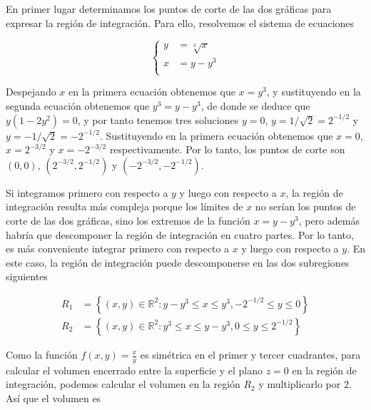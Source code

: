 \documentclass[
  a4paper,
]{scrreport}
\theoremstyle{definition}
\theoremstyle{remark}
\begin{document}
\begin{tcolorbox}[enhanced jigsaw, opacityback=0, bottomtitle=1mm, coltitle=black, opacitybacktitle=0.6, colback=white, breakable, left=2mm, titlerule=0mm, bottomrule=.15mm, colbacktitle=quarto-callout-tip-color!10!white, toprule=.15mm, leftrule=.75mm, arc=.35mm, toptitle=1mm, colframe=quarto-callout-tip-color-frame, title=\textcolor{quarto-callout-tip-color}{\faLightbulb}\hspace{0.5em}{Solución}, rightrule=.15mm]

En primer lugar determinamos los puntos de corte de las dos gráficas
para expresar la región de integración. Para ello, resolvemos el sistema
de ecuaciones

\[
\begin{cases}
y &= \sqrt[3]{x}\\
x &= y-y^3 \\
\end{cases}
\]

Despejando \(x\) en la primera ecuación obtenemos que \(x=y^3\), y
sustituyendo en la segunda ecuación obtenemos que \(y^3 = y-y^3\), de
donde se deduce que \(y(1-2y^2)=0\), y por tanto tenemos tres soluciones
\(y=0\), \(y=1/\sqrt{2}=2^{-1/2}\) y \(y=-1/\sqrt{2}=-2^{-1/2}\).
Sustituyendo en la primera ecuación obtenemos que \(x=0\),
\(x=2^{-3/2}\) y \(x=-2^{-3/2}\) respectivamente. Por lo tanto, los
puntos de corte son \((0,0)\), \((2^{-3/2}, 2^{-1/2})\) y
\((-2^{-3/2}, -2^{-1/2})\).

Si integramos primero con respecto a \(y\) y luego con respecto a \(x\),
la región de integración resulta más compleja porque los límites de
\(x\) no serían los puntos de corte de las dos gráficas, sino los
extremos de la función \(x=y-y^3\), pero además habría que descomponer
la región de integración en cuatro partes. Por lo tanto, es más
conveniente integrar primero con respecto a \(x\) y luego con respecto a
\(y\). En este caso, la región de integración puede descomponerse en las
dos subregiones siguientes

\begin{align*}
R_1 &= \left\{ (x,y) \in \mathbb{R}^2:  y-y^3 \leq x \leq y^3, -2^{-1/2} \leq y \leq 0 \right\} \\
R_2 &= \left\{ (x,y) \in \mathbb{R}^2:  y^3 \leq x \leq y-y^3, 0 \leq y \leq 2^{-1/2} \right\}
\end{align*}

Como la función \(f(x,y)=\frac{x}{y}\) es simétrica en el primer y
tercer cuadrantes, para calcular el volumen encerrado entre la
superficie y el plano \(z=0\) en la región de integración, podemos
calcular el volumen en la región \(R_2\) y multiplicarlo por 2. Así que
el volumen es


\end{tcolorbox}
\end{document}
